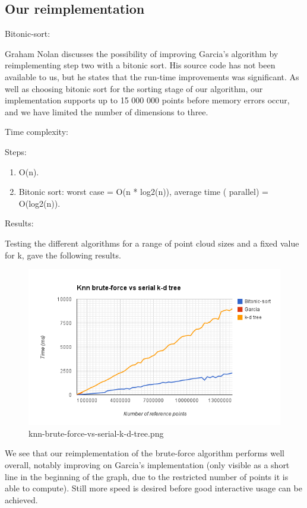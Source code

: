 \subsection{Our reimplementation} %
\label{ssub:our_reimplementation_2}

Bitonic-sort:

Graham Nolan discusses the possibility of improving Garcia's algorithm by reimplementing step two with a bitonic sort. His source code has not been available to us, but he states that the run-time improvements was significant. As well as choosing bitonic sort for the sorting stage of our algorithm, our implementation supports up to 15 000 000 points before memory errors occur, and we have limited the number of dimensions to three.

Time complexity:

Steps:
\begin{enumerate}
    \item O(n).
    \item Bitonic sort: worst case = O(n * log2(n)), average time ( parallel) = O(log2(n)).
\end{enumerate}

Results:

Testing the different algorithms for a range of point cloud sizes and a fixed value for k, gave the following results.

\begin{figure}[ht!]
\centering
\includegraphics[width=120mm]{../gfx/knn-brute-force-vs-serial-k-d-tree.png}

\caption{knn-brute-force-vs-serial-k-d-tree.png}
\label{fig:knn_brute_force_vs_serial_k_d_tree}
\end{figure}

We see that our reimplementation of the brute-force algorithm performs well overall, notably improving on Garcia's implementation (only visible as a short line in the beginning of the graph, due to the restricted number of points it is able to compute). Still more speed is desired before good interactive usage can be achieved.

